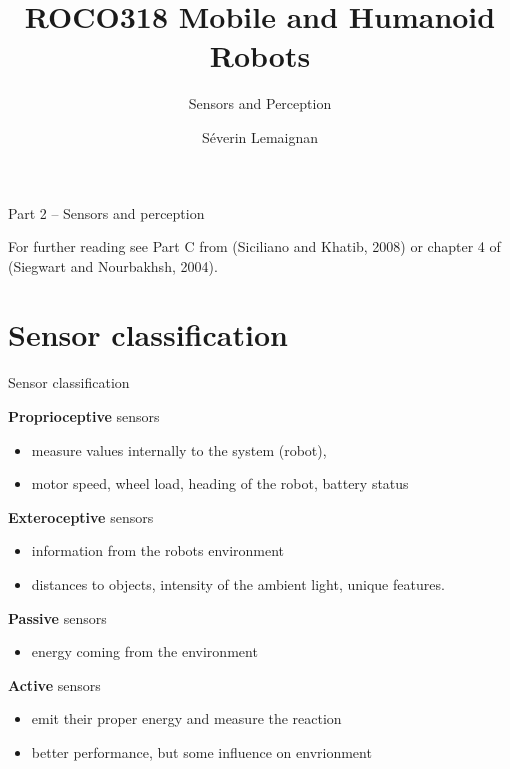 \documentclass[compress]{beamer}
\title{ROCO318 \newline Mobile and Humanoid Robots}
\subtitle{Sensors and Perception}
\date{}
\author{Séverin Lemaignan}
\institute{Centre for Neural Systems and Robotics\\{\bf Plymouth University}}
\begin{document}

\maketitle

\begin{frame}{Part 2 -- Sensors and perception}

    For further reading see Part C from (Siciliano and Khatib, 2008) or
    chapter 4 of (Siegwart and Nourbakhsh, 2004).

\end{frame}

\section{Sensor classification}\label{sensor-classification}

\begin{frame}{Sensor classification}

    \footnotesize
    \textbf{Proprioceptive} sensors

    \begin{itemize}

        \item
              measure values internally to the system (robot),
        \item
              \eg motor speed, wheel load, heading of the robot, battery status
    \end{itemize}

    \textbf{Exteroceptive} sensors

    \begin{itemize}

        \item
              information from the robots environment
        \item
              distances to objects, intensity of the ambient light, unique features.
    \end{itemize}

    \textbf{Passive} sensors

    \begin{itemize}

        \item
              energy coming from the environment
    \end{itemize}

    \textbf{Active} sensors

    \begin{itemize}

        \item
              emit their proper energy and measure the reaction
        \item
              better performance, but some influence on envrionment
    \end{itemize}

\end{frame}
\end{document}
